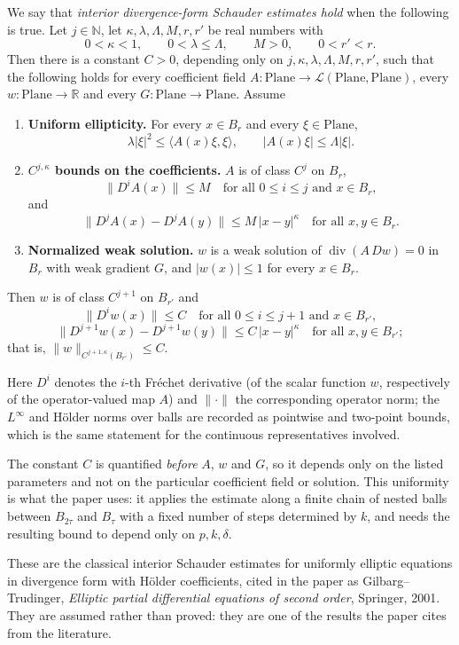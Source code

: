 \begin{definition}
We say that \emph{interior divergence-form Schauder estimates hold} when the following is
true.  Let $j\in\mathbb{N}$, let $\kappa,\lambda,\Lambda,M,r,r'$ be real numbers with
\[
  0<\kappa<1,\qquad 0<\lambda\le\Lambda,\qquad M>0,\qquad 0<r'<r .
\]
Then there is a constant $C>0$, depending only on $j,\kappa,\lambda,\Lambda,M,r,r'$, such
that the following holds for every coefficient field
$A\colon\mathrm{Plane}\to\mathcal{L}(\mathrm{Plane},\mathrm{Plane})$, every
$w\colon\mathrm{Plane}\to\mathbb{R}$ and every $G\colon\mathrm{Plane}\to\mathrm{Plane}$.
Assume
\begin{enumerate}
\item \textbf{Uniform ellipticity.} For every $x\in B_r$ and every $\xi\in\mathrm{Plane}$,
\[
  \lambda\lvert\xi\rvert^2\le\bigl\langle A(x)\xi,\xi\bigr\rangle,
  \qquad \lvert A(x)\xi\rvert\le\Lambda\lvert\xi\rvert .
\]
\item \textbf{$C^{j,\kappa}$ bounds on the coefficients.} $A$ is of class $C^{j}$ on $B_r$,
\[
  \lVert D^iA(x)\rVert\le M\quad\text{for all }0\le i\le j\text{ and }x\in B_r,
\]
and
\[
  \lVert D^jA(x)-D^jA(y)\rVert\le M\,\lvert x-y\rvert^{\kappa}\quad\text{for all }x,y\in B_r .
\]
\item \textbf{Normalized weak solution.} $w$ is a weak solution of
$\operatorname{div}(A\,Dw)=0$ in $B_r$ with weak gradient $G$, and
$\lvert w(x)\rvert\le1$ for every $x\in B_r$.
\end{enumerate}
Then $w$ is of class $C^{j+1}$ on $B_{r'}$ and
\[
  \lVert D^iw(x)\rVert\le C\quad\text{for all }0\le i\le j+1\text{ and }x\in B_{r'},
\]
\[
  \lVert D^{j+1}w(x)-D^{j+1}w(y)\rVert\le C\,\lvert x-y\rvert^{\kappa}
  \quad\text{for all }x,y\in B_{r'} ;
\]
that is, $\lVert w\rVert_{C^{j+1,\kappa}(B_{r'})}\le C$.

Here $D^i$ denotes the $i$-th Fr\'echet derivative (of the scalar function $w$, respectively
of the operator-valued map $A$) and $\lVert\cdot\rVert$ the corresponding operator norm; the
$L^\infty$ and H\"older norms over balls are recorded as pointwise and two-point bounds,
which is the same statement for the continuous representatives involved.

The constant $C$ is quantified \emph{before} $A$, $w$ and $G$, so it depends only on the
listed parameters and not on the particular coefficient field or solution.  This uniformity
is what the paper uses: it applies the estimate along a finite chain of nested balls between
$B_{2\tau}$ and $B_\tau$ with a fixed number of steps determined by $k$, and needs the
resulting bound to depend only on $p,k,\delta$.

These are the classical interior Schauder estimates for uniformly elliptic equations in
divergence form with H\"older coefficients, cited in the paper as Gilbarg--Trudinger,
\emph{Elliptic partial differential equations of second order}, Springer, 2001.  They are
assumed rather than proved: they are one of the results the paper cites from the literature.
\end{definition}
